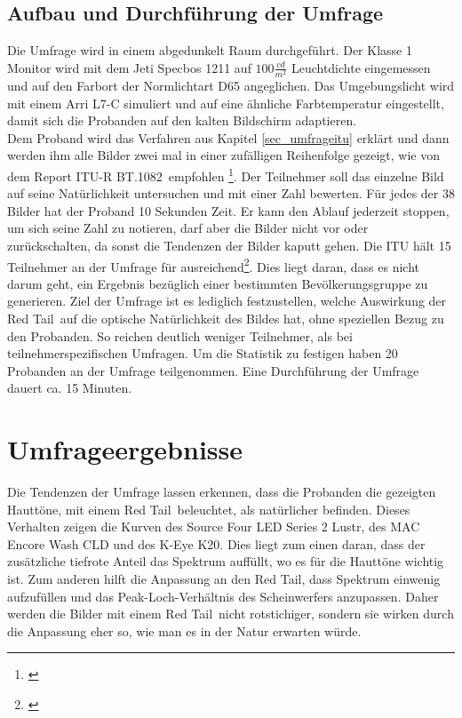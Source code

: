 \section{Aufbau und Durchführung der Umfrage} 
Die Umfrage wird in einem abgedunkelt Raum durchgeführt. Der Klasse 1 Monitor wird mit dem Jeti Specbos 1211 auf $100\frac{cd}{m^{2}}$ Leuchtdichte eingemessen und auf den Farbort der Normlichtart D65 angeglichen. Das Umgebungslicht wird mit einem Arri L7-C simuliert und  auf eine ähnliche Farbtemperatur eingestellt, damit sich die Probanden auf den kalten Bildschirm adaptieren.\\
Dem Proband wird das Verfahren aus Kapitel \ref{sec_umfrageitu}  erklärt und dann werden ihm alle Bilder zwei mal in einer zufälligen Reihenfolge gezeigt, wie von dem \glqq Report ITU-R BT.1082\grqq\ empfohlen \footnote{\cite[368]{itu90}}. Der Teilnehmer soll das einzelne Bild auf seine Natürlichkeit untersuchen und mit einer Zahl bewerten. Für jedes der 38 Bilder hat der Proband 10 Sekunden Zeit. Er kann den Ablauf jederzeit stoppen, um sich seine Zahl zu notieren, darf aber die Bilder nicht vor oder zurückschalten, da sonst die Tendenzen der Bilder kaputt gehen. Die ITU hält 15 Teilnehmer an der Umfrage für ausreichend\footnote{\cite[368]{itu90}}. Dies liegt daran, dass es nicht darum geht, ein Ergebnis bezüglich einer bestimmten Bevölkerungsgruppe zu generieren. Ziel der Umfrage ist es lediglich festzustellen, welche Auswirkung der \glqq Red Tail\grqq\ auf die optische Natürlichkeit des Bildes hat, ohne speziellen Bezug zu den Probanden. So reichen deutlich weniger Teilnehmer, als bei teilnehmerspezifischen Umfragen. Um die Statistik zu festigen haben 20 Probanden an der Umfrage teilgenommen. Eine Durchführung der Umfrage dauert ca. 15 Minuten.


\chapter{Umfrageergebnisse}
Die Tendenzen der Umfrage lassen erkennen, dass die Probanden die gezeigten Hauttöne, mit einem \glqq Red Tail\grqq\ beleuchtet, als natürlicher befinden. Dieses Verhalten zeigen die Kurven des Source Four LED Series 2 Lustr, des MAC Encore Wash CLD und des K-Eye K20. %
Dies liegt zum einen daran, dass der zusätzliche tiefrote Anteil das Spektrum auffüllt, wo es für die Hauttöne wichtig ist. %
Zum anderen hilft die Anpassung an den \glqq Red Tail\grqq , dass Spektrum einwenig aufzufüllen und das Peak-Loch-Verhältnis des Scheinwerfers anzupassen. Daher werden die Bilder mit einem \glqq Red Tail\grqq\ nicht rotstichiger, sondern sie wirken durch die Anpassung eher so, wie man es in der Natur erwarten würde.

